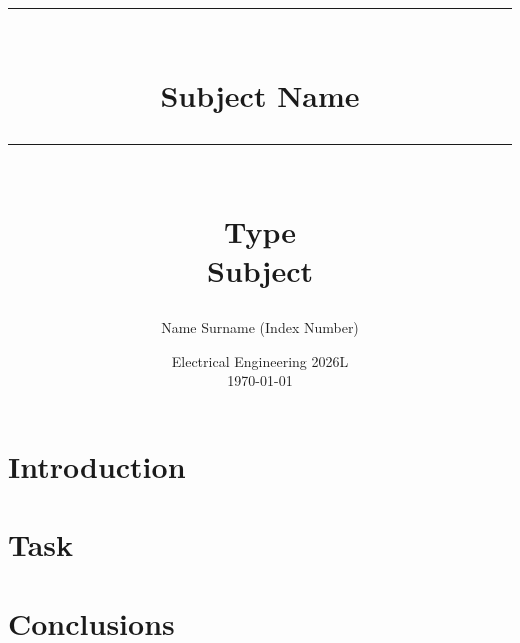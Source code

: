 \documentclass[leqno]{extarticle} %
\title{\noindent\rule{\textwidth}{1pt}\\ \Huge Subject Name\\ \noindent\rule{\textwidth}{1pt}  \large \\Type\\
        \Large Subject\normalsize}
\author{Name Surname (Index Number)}
\date{Electrical Engineering 2026L\\\today}
\begin{document}
\begin{titlepage}
    \raggedbottom
    \begin{figure}[t!]
        \centering
        
    \end{figure}
    \vspace*{5cm}
    \let\newpage\relax\maketitle
    \thispagestyle{empty}
\end{titlepage}
\newpage
\setcounter{page}{1}
\part*{Introduction}
    
\part*{Task}
    
\part*{Conclusions}
    
\end{document}
